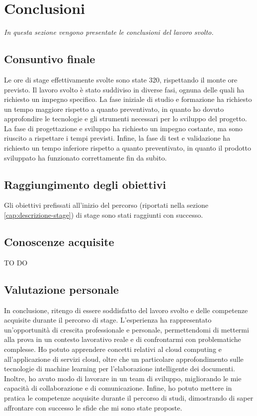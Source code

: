 \chapter{Conclusioni}
\label{cap:conclusioni}
\emph{In questa sezione vengono presentate le conclusioni del lavoro svolto.}

\section{Consuntivo finale}

Le ore di stage effettivamente svolte sono state 320, rispettando il monte ore previsto. Il lavoro svolto è stato suddiviso in diverse fasi, ognuna delle quali ha richiesto un impegno specifico. La fase iniziale di studio e formazione ha richiesto un tempo maggiore rispetto a quanto preventivato, in quanto ho dovuto approfondire le tecnologie e gli strumenti necessari per lo sviluppo del progetto. La fase di progettazione e sviluppo ha richiesto un impegno costante, ma sono riuscito a rispettare i tempi previsti. Infine, la fase di test e validazione ha richiesto un tempo inferiore rispetto a quanto preventivato, in quanto il prodotto sviluppato ha funzionato correttamente fin da subito.

\section{Raggiungimento degli obiettivi}
Gli obiettivi prefissati all'inizio del percorso (riportati nella sezione \ref{cap:descrizione-stage}) di stage sono stati raggiunti con successo. 


\section{Conoscenze acquisite}
TO DO

\section{Valutazione personale}
In conclusione, ritengo di essere soddisfatto del lavoro svolto e delle competenze acquisite durante il percorso di stage. L'esperienza ha rappresentato un'opportunità di crescita professionale e personale, permettendomi di mettermi alla prova in un contesto lavorativo reale e di confrontarmi con problematiche complesse. Ho potuto apprendere concetti relativi al cloud computing e all'applicazione di servizi cloud, oltre che un particolare approfondimento sulle tecnologie di machine learning per l'elaborazione intelligente dei documenti. Inoltre, ho avuto modo di lavorare in un team di sviluppo, migliorando le mie capacità di collaborazione e di comunicazione. Infine, ho potuto mettere in pratica le competenze acquisite durante il percorso di studi, dimostrando di saper affrontare con successo le sfide che mi sono state proposte.
